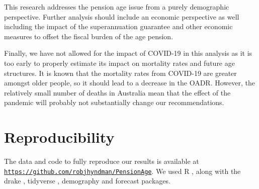 \documentclass[
  doublespace]{anzsauth}
\begin{document}
This research addresses the pension age issue from a purely demographic perspective. Further analysis should include an economic perspective as well including the impact of the superannuation guarantee and other economic measures to offset the fiscal burden of the age pension.

Finally, we have not allowed for the impact of COVID-19 in this analysis as it is too early to properly estimate its impact on mortality rates and future age structures. It is known that the mortality rates from COVID-19 are greater amongst older people, so it should lead to a decrease in the OADR. However, the relatively small number of deaths in Australia mean that the effect of the pandemic will probably not substantially change our recommendations.

\hypertarget{reproducibility}{%
\section*{Reproducibility}\label{reproducibility}}

The data and code to fully reproduce our results is available at \href{https://github.com/robjhyndman/PensionAge}{\texttt{https://github.com/robjhyndman/PensionAge}}. We used R \citep{RCore}, along with the drake \citep{Rdrake}, tidyverse \citep{Rtidyverse}, demography \citep{Rdemography} and forecast \citep{Rforecast} packages.

  
\end{document}
